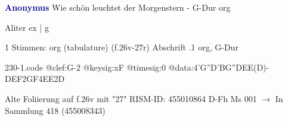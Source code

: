 \documentclass[twocolumn]{book}
\begin{document}
\newline \par \vspace{7pt} \textcolor{darkblue}{\textbf{Anonymus  }}
\newline Wie schön leuchtet der Morgenstern - G-Dur
\newline org
\newline \begin{itshape}[f.26v, at left:] Aliter ex | g\end{itshape} 
\newline \textcolor{darkblue}{}  1 Stimmen: org (tabulature)  (f.26v-27r)
\newline Abschrift
.1  org, G-Dur  
\begin{filecontents*}{230-1.code}
@clef:G-2
@keysig:xF
@timesig:0
@data:4'G''D'BG''DEE(D)-DEF2GF4EE2D
\end{filecontents*}
\newline
%
\newline Alte Foliierung auf f.26v mit "27"
\newline RISM-ID: 455010864
\newline D-Fh  Ms 001
\newline $\rightarrow$ In Sammlung 418 (455008343)
      
\end{document}
